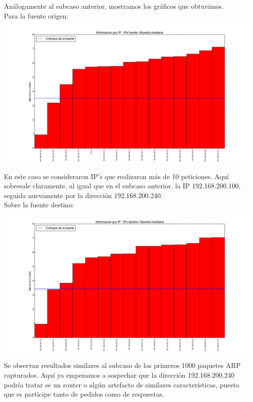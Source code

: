\indent \indent Análogamente al subcaso anterior, mostramos los gráficos que obtuvimos.\\
\indent Para la fuente origen:\\

\includegraphics[scale=0.5,clip=true,trim=100 0 0 0]{graphics/laburo_mediana_src.png}

\indent En este caso se consideraron IP's que realizaron más de 10 peticiones. Aquí sobresale claramente, al igual que en el subcaso anterior, la IP 192.168.200.100, seguida nuevamente por la dirección 192.168.200.240.\\

\indent Sobre la fuente destino:\\

\includegraphics[scale=0.5,clip=true,trim=100 0 0 0]{graphics/laburo_mediana_dst.png}

\indent  Se observan resultados similares al subcaso de los primeros 1000 paquetes ARP capturados. Aquí ya empezamos a sospechar que la dirección 192.168.200.240 podría tratar se un router o algún artefacto de similares características, puesto que es participe tanto de pedidos como de respuestas.\\

